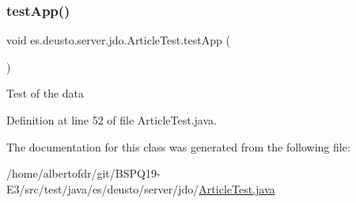 \subsubsection{\texorpdfstring{test\+App()}{testApp()}}
{\footnotesize\ttfamily void es.\+deusto.\+server.\+jdo.\+Article\+Test.\+test\+App (\begin{DoxyParamCaption}{ }\end{DoxyParamCaption})}

Test of the data 

Definition at line 52 of file Article\+Test.\+java.



The documentation for this class was generated from the following file\+:\begin{DoxyCompactItemize}
\item 
/home/albertofdr/git/\+B\+S\+P\+Q19-\/\+E3/src/test/java/es/deusto/server/jdo/\hyperlink{_article_test_8java}{Article\+Test.\+java}\end{DoxyCompactItemize}

